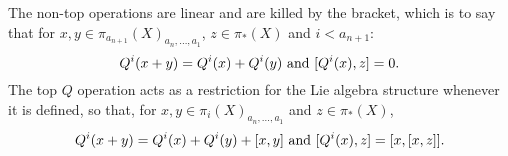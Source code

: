 \documentclass[10pt]{article}
\newcommand{\RestLie}[1]{\mathsf{r}{\scrL}^{#1}}%
\newcommand{\GoodLie}[1]{\mathsf{g}{\scrL}^{#1}}%
\newcommand{\restn}[2][]{\ifblank{#1}{\xi{#2}}{\xi_{#1}{#2}}}%
\renewcommand{\Q}{Q}
\begin{document}
\begin{CategoriesOfInterest}
\begin{prop}
The non-top operations are linear and are killed by the bracket, which is to say that for $x,y\in \pi_{a_{n+1}}(X)_{a_n,\ldots,a_1}$, $z\in \pi_*(X)$ and $i<a_{n+1}$: 
\[\Q^i{(x+y)}=\Q^i{(x)}+\Q^i{(y)}\textup{ and }[\Q^i{(x)},z]=0.\]
The top $\Q$ operation acts as a restriction for the Lie algebra structure whenever it is defined, so that, for $x,y\in \pi_i(X)_{ a_{n},\ldots,a_1}$ and $z\in \pi_*(X)$,
\[\Q^i(x+y)=\Q^i(x)+\Q^i(y)+[x,y]\textup{ and }[\Q^{i}(x),z]=[x,[x,z]].\]
\end{prop}


\end{CategoriesOfInterest}
\end{document}
